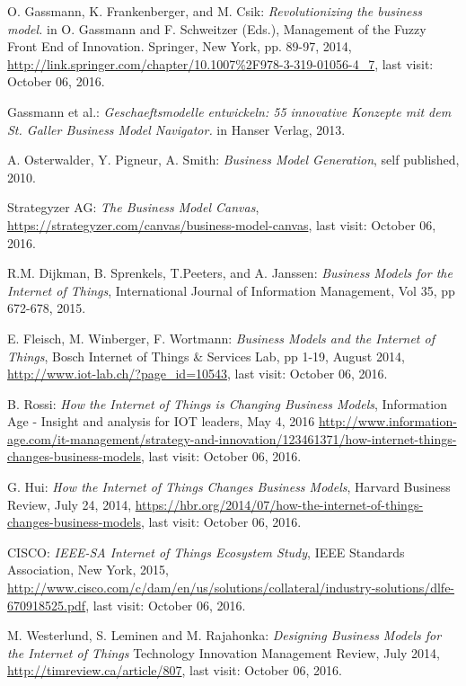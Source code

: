  \begin{thebibliography}{99}
	 O. Gassmann, K. Frankenberger, and M. Csik: \emph{Revolutionizing the business model.} in O. Gassmann and F. Schweitzer (Eds.), Management of the Fuzzy Front End of Innovation. Springer, New York, pp. 89-97, 2014, \url{http://link.springer.com/chapter/10.1007%2F978-3-319-01056-4_7}, last visit: October 06, 2016.


	  Gassmann et al.: \emph{Geschaeftsmodelle entwickeln: 55 innovative Konzepte mit dem St. Galler Business Model Navigator.} in Hanser Verlag, 2013.

	  A. Osterwalder, Y. Pigneur, A. Smith: \emph{Business Model Generation}, self published, 2010.

	  Strategyzer AG: \emph{The Business Model Canvas}, \url{https://strategyzer.com/canvas/business-model-canvas}, last visit: October 06, 2016.

	  R.M. Dijkman, B. Sprenkels, T.Peeters, and A. Janssen: \emph{Business Models for the Internet of Things}, International Journal of Information Management, Vol 35, pp 672-678, 2015.

	  E. Fleisch, M. Winberger, F. Wortmann: \emph{Business Models and the Internet of Things}, Bosch Internet of Things \& Services Lab, pp 1-19, August 2014, \url{http://www.iot-lab.ch/?page_id=10543}, last visit: October 06, 2016.

	  B. Rossi: \emph{How the Internet of Things is Changing Business Models}, Information Age - Insight and analysis for IOT leaders, May 4, 2016 \url{http://www.information-age.com/it-management/strategy-and-innovation/123461371/how-internet-things-changes-business-models}, last visit: October 06, 2016.

	  G. Hui: \emph{How the Internet of Things Changes Business Models}, Harvard Business Review, July 24, 2014, \url{https://hbr.org/2014/07/how-the-internet-of-things-changes-business-models}, last visit: October 06, 2016.

	  CISCO: \emph{IEEE-SA Internet of Things Ecosystem Study}, IEEE Standards Association, New York, 2015, \url{http://www.cisco.com/c/dam/en/us/solutions/collateral/industry-solutions/dlfe-670918525.pdf}, last visit: October 06, 2016.

	 M. Westerlund, S. Leminen and M. Rajahonka: \emph{Designing Business Models for the Internet of Things} Technology Innovation Management Review, July 2014, \url{http://timreview.ca/article/807}, last visit: October 06, 2016.


\end{thebibliography}
